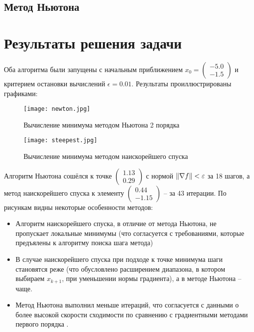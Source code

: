 \documentclass[main.tex]{subfiles}
\begin{document}
\subsection{Метод Ньютона}

\section{Результаты решения задачи}
Оба алгоритма были запущены с начальным приближением $x_0=\begin{pmatrix}-5.0\\-1.5\end{pmatrix}$ и критерием остановки вычислений $\epsilon = 0.01$. Результаты проиллюстрированы графиками:
\begin{figure}[H]
	\centering \texttt{[image: newton.jpg]}
	\caption{Вычисление минимума методом Ньютона 2 порядка}
	\label{im:newton}
\end{figure}
\begin{figure}[h]
	\centering \texttt{[image: steepest.jpg]}
	\caption{Вычисление минимума методом наискорейшего спуска}
	\label{im:steepest}
\end{figure}

Алгоритм Ньютона сошёлся к точке $\begin{pmatrix}1.13\\0.29\end{pmatrix}$ с нормой $\left\lVert\nabla f\right\rVert < \varepsilon$ за 18 шагов, а метод наискорейшего спуска к элементу $\begin{pmatrix}0.44\\-1.15\end{pmatrix}$ -- за 43 итерации. По рисункам видны некоторые особенности методов:
\begin{itemize}
	\item Алгоритм наискорейшего спуска, в отличие от метода Ньютона, не пропускает локальные минимумы (что согласуется с требованиями, которые предъялены к алгоритму поиска шага метода)
	\item В случае наискорейшего спуска при подходе к точке минимума шаги становятся реже (что обусловлено расширением диапазона, в котором выбираем $x_{k+1}$, при уменьшении нормы градиента), а в методе Ньютона -- чаще.
	\item Метод Ньютона выполнил меньше итераций, что согласуется с данными о более высокой скорости сходимости по сравнению с градиентными методами первого порядка \cite{boldirev}.
\end{itemize}
\end{document}
